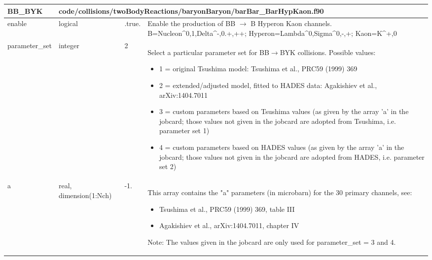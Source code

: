 \documentclass{article}
\begin{document}
\begin{longtable}{llll}
\toprule
\textbf{\large{BB\_BYK}} & \multicolumn{3}{l}{\footnotesize{code/collisions/twoBodyReactions/baryonBaryon/barBar\_BarHypKaon.f90}}\\*
\midrule
\endfirsthead
\midrule
\endhead
enable & \begin{minipage}[t]{2cm}logical\end{minipage} & \begin{minipage}[t]{2cm}.true.\end{minipage} & \begin{minipage}[t]{12cm}Enable the production of BB $\rightarrow$ B Hyperon Kaon channels. B=Nucleon\^{}{0,1},Delta\^{}{-,0.+,++}; Hyperon=Lambda\^{}{0},Sigma\^{}{0,-,+}; Kaon=K\^{}{+,0}\end{minipage}\\*
\midrule
parameter\_set & \begin{minipage}[t]{2cm}integer\end{minipage} & \begin{minipage}[t]{2cm}2\end{minipage} & \begin{minipage}[t]{12cm}Select a particular parameter set for BB$\rightarrow$BYK collisions. Possible values:\begin{itemize}\leftmargin0em\itemindent0pt\item 1 = original Tsushima model: Tsushima et al., PRC59 (1999) 369\item 2 = extended/adjusted model, fitted to HADES data:       Agakishiev et al., arXiv:1404.7011\item 3 = custom parameters based on Tsushima values (as given by the       array 'a' in the jobcard; those values not given in the jobcard       are adopted from Tsushima, i.e. parameter set 1)\item 4 = custom parameters based on HADES values (as given by the       array 'a' in the jobcard; those values not given in the jobcard       are adopted from HADES, i.e. parameter set 2)\end{itemize}\end{minipage}\\*
\midrule
a & \begin{minipage}[t]{2cm}real, dimension(1:Nch)\end{minipage} & \begin{minipage}[t]{2cm}-1.\end{minipage} & \begin{minipage}[t]{12cm}This array contains the "a" parameters (in microbarn) for the 30 primary channels, see:\begin{itemize}\leftmargin0em\itemindent0pt\item Tsushima et al., PRC59 (1999) 369, table III\item Agakishiev et al., arXiv:1404.7011, chapter IV\end{itemize} Note: The values given in the jobcard are only used for parameter\_set = 3 and 4.\end{minipage}\\*
\bottomrule
\end{longtable}
{ }
\end{document}
